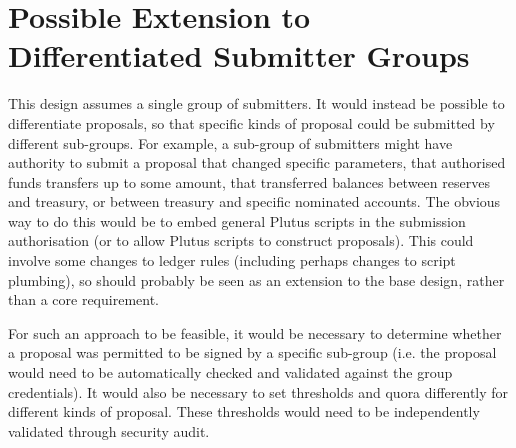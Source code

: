 \section{Possible Extension to Differentiated Submitter Groups}

This design assumes a single group of submitters.  It
would instead be possible to differentiate proposals, so that specific kinds of proposal
could be submitted by different sub-groups.  For example, a sub-group of submitters might have
authority to submit a proposal that changed specific parameters, that authorised
funds transfers up to some amount, that transferred balances between reserves
and treasury, or between treasury and specific nominated accounts.  The obvious
way to do this would be to embed general Plutus scripts in the submission
authorisation (or to allow Plutus scripts to construct proposals).  This could
involve some changes to ledger rules (including perhaps changes to script
plumbing), so should probably be seen as an extension to the base design, rather
than a core requirement.  

For such an approach to be feasible, it would be necessary to determine whether
a proposal was permitted to be signed by a specific sub-group (i.e. the proposal
would need to be automatically checked and validated against the group
credentials).  It would also be necessary to set thresholds and quora
differently for different kinds of proposal.  These thresholds would need to be
independently validated through security audit.
